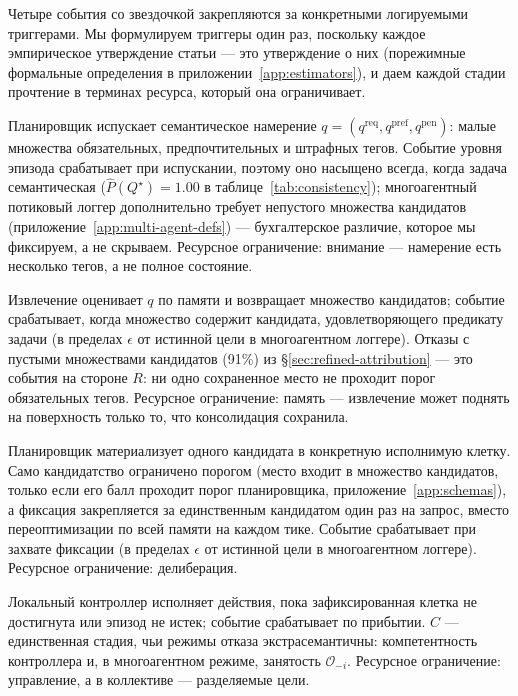\documentclass{article}
\begin{document}
Четыре события со звездочкой закрепляются за конкретными логируемыми триггерами. Мы формулируем триггеры один раз, поскольку каждое эмпирическое утверждение статьи --- это утверждение о них (порежимные формальные определения в приложении~\ref{app:estimators}), и даем каждой стадии прочтение в терминах ресурса, который она ограничивает.

\begin{description}[leftmargin=10pt,topsep=2pt,itemsep=2pt]
\item[$Q^\star$ (намерение выпущено).] Планировщик испускает семантическое намерение $q=(q^{\mathrm{req}},q^{\mathrm{pref}},q^{\mathrm{pen}})$: малые множества обязательных, предпочтительных и штрафных тегов. Событие уровня эпизода срабатывает при испускании, поэтому оно насыщено всегда, когда задача семантическая ($\hat P(Q^\star){=}1.00$ в таблице~\ref{tab:consistency}); многоагентный потиковый логгер дополнительно требует непустого множества кандидатов (приложение~\ref{app:multi-agent-defs}) --- бухгалтерское различие, которое мы фиксируем, а не скрываем. Ресурсное ограничение: внимание --- намерение есть несколько тегов, а не полное состояние.
\item[$R^\star$ (память отвечает).] Извлечение оценивает $q$ по памяти и возвращает множество кандидатов; событие срабатывает, когда множество содержит кандидата, удовлетворяющего предикату задачи (в пределах $\epsilon$ от истинной цели в многоагентном логгере). Отказы с пустыми множествами кандидатов (91\%) из \S\ref{sec:refined-attribution} --- это события на стороне $R$: ни одно сохраненное место не проходит порог обязательных тегов. Ресурсное ограничение: память --- извлечение может поднять на поверхность только то, что консолидация сохранила.
\item[$M^\star$ (фиксация цели).] Планировщик материализует одного кандидата в конкретную исполнимую клетку. Само кандидатство ограничено порогом (место входит в множество кандидатов, только если его балл проходит порог планировщика, приложение~\ref{app:schemas}), а фиксация закрепляется за единственным кандидатом один раз на запрос, вместо переоптимизации по всей памяти на каждом тике. Событие срабатывает при захвате фиксации (в пределах $\epsilon$ от истинной цели в многоагентном логгере). Ресурсное ограничение: делиберация.
\item[$C^\star$ (замкнутое завершение).] Локальный контроллер исполняет действия, пока зафиксированная клетка не достигнута или эпизод не истек; событие срабатывает по прибытии. $C$ --- единственная стадия, чьи режимы отказа экстрасемантичны: компетентность контроллера и, в многоагентном режиме, занятость $\mathcal{O}_{-i}$. Ресурсное ограничение: управление, а в коллективе --- разделяемые цели.
\end{description}
\end{document}
